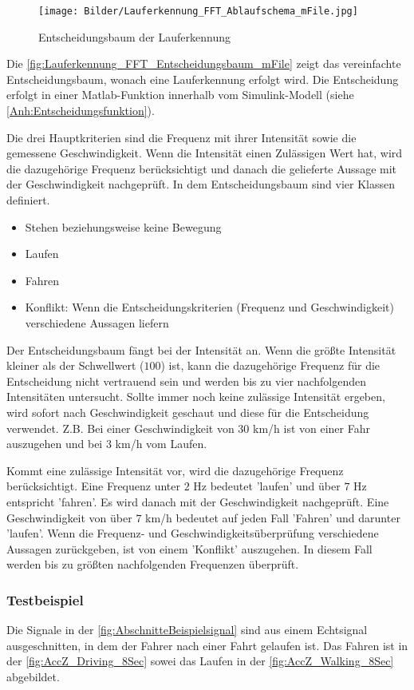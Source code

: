 \begin{figure}[H]
	\centering
	\texttt{[image: Bilder/Lauferkennung\_FFT\_Ablaufschema\_mFile.jpg]}
	\caption{Entscheidungsbaum der Lauferkennung}
	\label{fig:Lauferkennung_FFT_Entscheidungsbaum_mFile}
\end{figure}

Die \autoref{fig:Lauferkennung_FFT_Entscheidungsbaum_mFile} zeigt das vereinfachte Entscheidungsbaum, wonach eine Lauferkennung erfolgt wird. Die Entscheidung erfolgt in einer Matlab-Funktion innerhalb vom Simulink-Modell (siehe \autoref{Anh:Entscheidungsfunktion}).

Die drei Hauptkriterien sind die Frequenz mit ihrer Intensität sowie die gemessene Geschwindigkeit. Wenn die Intensität einen Zulässigen Wert hat, wird die dazugehörige Frequenz berücksichtigt und danach die gelieferte Aussage mit der Geschwindigkeit nachgeprüft.
In dem Entscheidungsbaum sind vier Klassen definiert.
\begin{itemize}
	\item Stehen beziehungsweise keine Bewegung
	\item Laufen
	\item Fahren
	\item Konflikt: Wenn die Entscheidungskriterien (Frequenz und Geschwindigkeit) verschiedene Aussagen liefern
\end{itemize}
Der Entscheidungsbaum fängt bei der Intensität an. Wenn die größte Intensität kleiner als der Schwellwert ($100$) ist, kann die dazugehörige Frequenz für die Entscheidung nicht vertrauend sein und werden bis zu vier nachfolgenden Intensitäten untersucht. Sollte immer noch keine zulässige Intensität ergeben, wird sofort nach Geschwindigkeit geschaut und diese für die Entscheidung verwendet.
Z.B. Bei einer Geschwindigkeit von $30$ km/h ist von einer Fahr auszugehen und bei $3$ km/h vom Laufen.

Kommt eine zulässige Intensität vor, wird die dazugehörige Frequenz berücksichtigt. Eine Frequenz unter $2$ Hz bedeutet 'laufen' und über $7$ Hz entspricht 'fahren'. Es wird danach mit der Geschwindigkeit nachgeprüft. Eine Geschwindigkeit von über $7$ km/h bedeutet auf jeden Fall 'Fahren' und darunter 'laufen'.
Wenn die Frequenz- und Geschwindigkeitsüberprüfung verschiedene Aussagen zurückgeben, ist von einem 'Konflikt' auszugehen. In diesem Fall werden bis zu größten nachfolgenden Frequenzen überprüft.


\subsubsection{Testbeispiel}
Die Signale in der \autoref{fig:AbschnitteBeispielsignal} sind aus einem Echtsignal ausgeschnitten, in dem der Fahrer nach einer Fahrt gelaufen ist. Das Fahren ist in der \autoref{fig:AccZ_Driving_8Sec} sowei das Laufen in der \autoref{fig:AccZ_Walking_8Sec} abgebildet.

